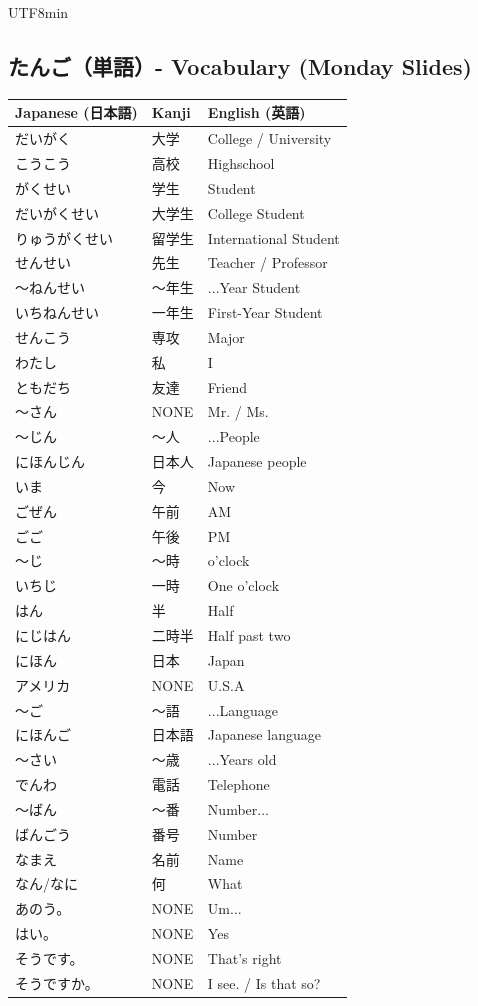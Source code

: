 \documentclass[11pt]{article}
\begin{document}
\begin{CJK}{UTF8}{min}
\subsection{たんご（単語）- Vocabulary (Monday Slides)}
\begin{tabularx}{\textwidth}{X | X | X}
    \toprule
    \textbf{Japanese (日本語)} & \textbf{Kanji} & \textbf{English (英語)} \\
    \midrule
    だいがく & 大学 & College / University \\
    こうこう & 高校 & Highschool \\
    がくせい & 学生 & Student \\
    だいがくせい & 大学生 & College Student \\
    りゅうがくせい & 留学生 & International Student \\
    せんせい & 先生 & Teacher / Professor \\
    〜ねんせい & 〜年生 & ...Year Student \\
    いちねんせい & 一年生 & First-Year Student \\
    せんこう & 専攻 & Major \\
    わたし & 私 & I \\
    ともだち & 友達 & Friend \\
    〜さん & NONE & Mr. / Ms. \\
    〜じん & 〜人 & ...People \\
    にほんじん & 日本人 & Japanese people \\
    いま & 今 & Now \\
    ごぜん & 午前 & AM \\
    ごご & 午後 & PM \\
    〜じ & 〜時 & o'clock \\
    いちじ & 一時 & One o'clock \\
    はん & 半 & Half \\
    にじはん & 二時半 & Half past two \\
    にほん & 日本 & Japan \\
    アメリカ & NONE & U.S.A \\
    〜ご & 〜語 & ...Language \\
    にほんご & 日本語 & Japanese language \\
    〜さい & 〜歳 & ...Years old \\
    でんわ & 電話 & Telephone \\
    〜ばん & 〜番 & Number...\\
    ばんごう & 番号 & Number \\
    なまえ & 名前 & Name \\
    なん/なに & 何 & What \\
    あのう。 & NONE & Um...\\
    はい。 & NONE & Yes \\
    そうです。 & NONE & That's right \\
    そうですか。 & NONE & I see. / Is that so? \\
    \bottomrule
\end{tabularx}


\end{CJK}
\end{document}
